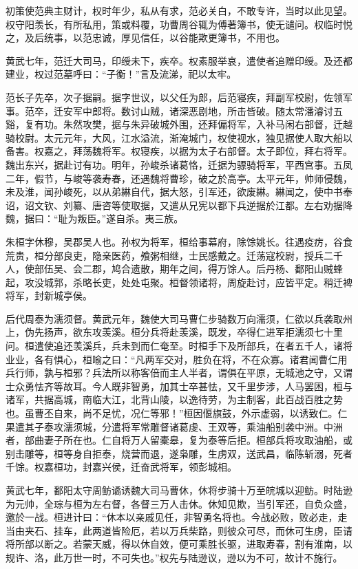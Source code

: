 \documentclass[12pt,UTF8]{ctexbook}
\begin{document}
初策使范典主财计，权时年少，私从有求，范必关白，不敢专许，当时以此见望。权守阳羡长，有所私用，策或料覆，功曹周谷辄为傅著簿书，使无谴问。权临时悦之，及后统事，以范忠诚，厚见信任，以谷能欺更簿书，不用也。

黄武七年，范迁大司马，印绶未下，疾卒。权素服举哀，遣使者追赠印绶。及还都建业，权过范墓呼曰：“子衡！”言及流涕，祀以太牢。

范长子先卒，次子据嗣。据字世议，以父任为郎，后范寝疾，拜副军校尉，佐领军事。范卒，迁安军中郎将。数讨山贼，诸深恶剧地，所击皆破。随太常潘濬讨五谿，复有功。朱然攻樊，据与朱异破城外围，还拜偏将军，入补马闲右部督，迁越骑校尉。太元元年，大风，江水溢流，渐淹城门，权使视水，独见据使人取大船以备害。权嘉之，拜荡魏将军。权寝疾，以据为太子右部督。太子即位，拜右将军。魏出东兴，据赴讨有功。明年，孙峻杀诸葛恪，迁据为骠骑将军，平西宫事。五凤二年，假节，与峻等袭寿春，还遇魏将曹珍，破之於高亭。太平元年，帅师侵魏，未及淮，闻孙峻死，以从弟綝自代，据大怒，引军还，欲废綝。綝闻之，使中书奉诏，诏文钦、刘纂、唐咨等使取据，又遣从兄宪以都下兵逆据於江都。左右劝据降魏，据曰：“耻为叛臣。”遂自杀。夷三族。

朱桓字休穆，吴郡吴人也。孙权为将军，桓给事幕府，除馀姚长。往遇疫疠，谷食荒贵，桓分部良吏，隐亲医药，飧粥相继，士民感戴之。迁荡寇校尉，授兵二千人，使部伍吴、会二郡，鸠合遗散，期年之间，得万馀人。后丹杨、鄱阳山贼蜂起，攻没城郭，杀略长吏，处处屯聚。桓督领诸将，周旋赴讨，应皆平定。稍迁裨将军，封新城亭侯。

后代周泰为濡须督。黄武元年，魏使大司马曹仁步骑数万向濡须，仁欲以兵袭取州上，伪先扬声，欲东攻羡溪。桓分兵将赴羡溪，既发，卒得仁进军拒濡须七十里问。桓遣使追还羡溪兵，兵未到而仁奄至。时桓手下及所部兵，在者五千人，诸将业业，各有惧心，桓喻之曰：“凡两军交对，胜负在将，不在众寡。诸君闻曹仁用兵行师，孰与桓邪？兵法所以称客倍而主人半者，谓俱在平原，无城池之守，又谓士众勇怯齐等故耳。今人既非智勇，加其士卒甚怯，又千里步涉，人马罢困，桓与诸军，共据高城，南临大江，北背山陵，以逸待劳，为主制客，此百战百胜之势也。虽曹丕自来，尚不足忧，况仁等邪！”桓因偃旗鼓，外示虚弱，以诱致仁。仁果遣其子泰攻濡须城，分遣将军常雕督诸葛虔、王双等，乘油船别袭中洲。中洲者，部曲妻子所在也。仁自将万人留橐皋，复为泰等后拒。桓部兵将攻取油船，或别击雕等，桓等身自拒泰，烧营而退，遂枭雕，生虏双，送武昌，临陈斩溺，死者千馀。权嘉桓功，封嘉兴侯，迁奋武将军，领彭城相。

黄武七年，鄱阳太守周鲂谲诱魏大司马曹休，休将步骑十万至皖城以迎鲂。时陆逊为元帅，全琮与桓为左右督，各督三万人击休。休知见欺，当引军还，自负众盛，邀於一战。桓进计曰：“休本以亲戚见任，非智勇名将也。今战必败，败必走，走当由夹石、挂车，此两道皆险厄，若以万兵柴路，则彼众可尽，而休可生虏，臣请将所部以断之。若蒙天威，得以休自效，便可乘胜长驱，进取寿春，割有淮南，以规许、洛，此万世一时，不可失也。”权先与陆逊议，逊以为不可，故计不施行。
\end{document}

